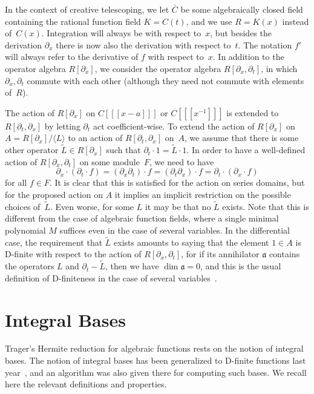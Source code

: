 \documentclass{sig-alternate}
\def\<#1>{\langle#1\rangle}
\begin{document}
In the context of creative telescoping, we let $\bar C$ be some algebraically
closed field containing the rational function field $K=C(t)$, and we
use $R=K(x)$ instead of~$C(x)$. Integration will always be with respect to~$x$, but
besides the derivation $\partial_x$ there is now also the derivation with respect
to~$t$. The notation $f'$ will always refer to the derivative of $f$
with respect to~$x$. In addition to the operator algebra $R[\partial_x]$, we consider the
operator algebra $R[\partial_x,\partial_t]$, in which $\partial_x,\partial_t$
commute with each other (although they need not commute with elements of~$R$).

The action of $R[\partial_x]$ on $C[[[x-a]]]$ or $C[[[x^{-1}]]]$ is extended
to $R[\partial_t,\partial_x]$ by letting $\partial_t$ act coefficient-wise.
To extend the action of $R[\partial_x]$ on $A=R[\partial_x]/\<L>$ to an action of
$R[\partial_t,\partial_x]$ on~$A$, we assume that there is some other
operator $\tilde L\in R[\partial_x]$ such that $\partial_t\cdot1=\tilde L\cdot 1$.
In order to have a well-defined action of $R[\partial_x,\partial_t]$ on some module~$F$,
we need to have
\[
\partial_x\cdot(\partial_t\cdot f)=(\partial_x\partial_t)\cdot f=(\partial_t\partial_x)\cdot f=\partial_t\cdot(\partial_x\cdot f)
\]
for all $f\in F$. It is clear that this is satisfied for the action on series domains,
but for the proposed action on $A$ it implies an implicit restriction on the possible
choices of~$\tilde L$. Even worse, for some $L$ it may be that no $\tilde L$ exists.
Note that this is different from the case of algebraic function fields, where a single minimal polynomial $M$
suffices even in the case of several variables.
In the differential case, the requirement that $\tilde L$ exists amounts to saying that the element $1\in A$ is
D-finite with respect to the action of $R[\partial_x,\partial_t]$, for if its annihilator $\mathfrak{a}$
contains the operators $L$ and $\partial_t-\tilde L$, then we have $\dim\mathfrak{a}=0$, and this is the usual
definition of D-finiteness in the case of several variables~\cite{zeilberger90,chyzak98,koutschan09,kauers14c}.

\section{Integral Bases}

Trager's Hermite reduction for algebraic functions rests on the notion of
integral bases. The notion of integral bases has been generalized to D-finite
functions last year~\cite{kauers15b}, and an algorithm was also given there for
computing such bases. We recall here the relevant definitions and properties.
\end{document}
